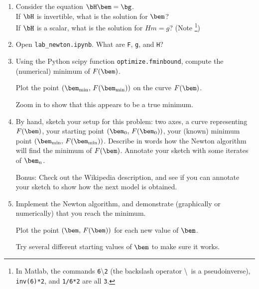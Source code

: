 \documentclass[11pt,titlepage,fleqn]{article}
\renewcommand{\vertgap}{\vspace{1.5cm}}
\begin{document}
\begin{enumerate}
\item Consider the equation $\bH\bem = \bg$. \\
If $\bH$ is invertible, what is the solution for $\bem$? \\
If $\bH$ is a scalar, what is the solution for $Hm = g$? (Note \footnote{In Matlab, the commands \texttt{6}\textbackslash\texttt{2} (the backslash operator \textbackslash\ is a pseudoinverse), \texttt{inv(6)*2}, and \texttt{1/6*2} are all \texttt{3}.})


\vertgap

\item Open \verb+lab_newton.ipynb+. What are \verb+F+, \verb+g+, and \verb+H+?

\vertgap

\item Using the Python scipy function \verb+optimize.fminbound+, compute the (numerical) minimum of $F(\bem)$.

Plot the point $(\bem_{\rm min},\,F(\bem_{\rm min}))$ on the curve $F(\bem)$.

Zoom in to show that this appears to be a true minimum.

\item By hand, sketch your setup for this problem: two axes, a curve representing $F(\bem)$, your starting point $(\bem_0,\,F(\bem_0))$, your (known) minimum point $(\bem_{\rm min},\,F(\bem_{\rm min}))$. Describe in words how the Newton algorithm will find the minimum of $F(\bem)$. Annotate your sketch with some iterates of $\bem_n$.

Bonus: Check out the Wikipedia description, and see if you can annotate your sketch to show how the next model is obtained.

\vspace{10cm}

\item Implement the Newton algorithm, and demonstrate (graphically or numerically) that you reach the minimum.

Plot the point $(\bem,\,F(\bem))$ for each new value of $\bem$.

Try several different starting values of $\bem$ to make sure it works.

\vertgap


\end{enumerate}
\end{document}
